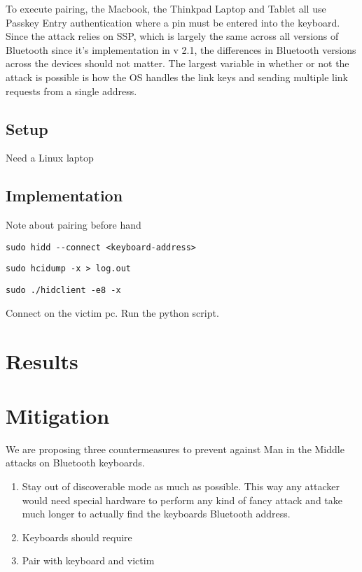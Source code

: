 \documentclass{acm_proc_article-sp}
\begin{document}
To execute pairing, the Macbook, the Thinkpad Laptop and Tablet all use Passkey Entry authentication where a pin must be entered into the keyboard. Since the attack relies on SSP, which is largely the same across all versions of Bluetooth since it's implementation in v 2.1, the differences in Bluetooth versions across the devices should not matter. The largest variable in whether or not the attack is possible is how the OS handles the link keys and sending multiple link requests from a single address. 

\subsection{Setup}
Need a Linux laptop

\subsection{Implementation}
Note about pairing before hand
\begin{verbatim}
sudo hidd --connect <keyboard-address>
\end{verbatim}

\begin{verbatim}
sudo hcidump -x > log.out
\end{verbatim}

\begin{verbatim}
sudo ./hidclient -e8 -x
\end{verbatim}

Connect on the victim pc.
Run the python script.

\section{Results}

\section{Mitigation}
We are proposing three countermeasures to prevent against Man in the Middle attacks on Bluetooth keyboards.

\begin{enumerate}
\item Stay out of discoverable mode as much as possible. This way any attacker would need special hardware to perform any kind of fancy attack and take much longer to actually find the keyboards Bluetooth address.
\item Keyboards should require 
\item Pair with keyboard and victim
\end{enumerate}
\end{document}
